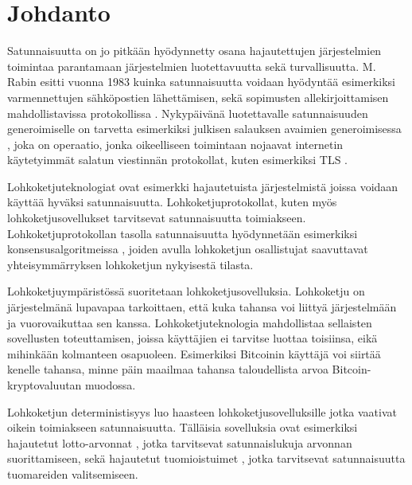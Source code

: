 \chapter{Johdanto\label{intro}}

Satunnaisuutta on jo pitkään hyödynnetty osana hajautettujen järjestelmien toimintaa parantamaan järjestelmien luotettavuutta sekä turvallisuutta. M. Rabin esitti vuonna 1983 kuinka satunnaisuutta voidaan hyödyntää esimerkiksi varmennettujen sähköpostien lähettämisen, sekä sopimusten allekirjoittamisen mahdollistavissa protokollissa \cite{rabin_transaction_1983}. Nykypäivänä luotettavalle satunnaisuuden generoimiselle on tarvetta esimerkiksi julkisen salauksen avaimien generoimisessa \cite{corrigan-gibbs_ensuring_2014}, joka on operaatio, jonka oikeelliseen toimintaan nojaavat internetin käytetyimmät salatun viestinnän protokollat, kuten esimerkiksi TLS \cite{rfc8446}. 

Lohkoketjuteknologiat ovat esimerkki hajautetuista järjestelmistä joissa voidaan käyttää hyväksi satunnaisuutta. Lohkoketjuprotokollat, kuten myös lohkoketjusovellukset tarvitsevat satunnaisuutta toimiakseen. Lohkoketjuprotokollan tasolla satunnaisuutta hyödynnetään esimerkiksi  konsensusalgoritmeissa \cite{gilad_algorand_2017, hanke_dfinity_2018}, joiden avulla lohkoketjun osallistujat saavuttavat yhteisymmärryksen lohkoketjun nykyisestä tilasta. 


Lohkoketjuympäristössä suoritetaan lohkoketjusovelluksia. Lohkoketju on järjestelmänä lupavapaa tarkoittaen, että kuka tahansa voi liittyä järjestelmään ja vuorovaikuttaa sen kanssa. Lohkoketjuteknologia mahdollistaa sellaisten sovellusten toteuttamisen, joissa käyttäjien ei tarvitse luottaa toisiinsa, eikä mihinkään kolmanteen osapuoleen. Esimerkiksi Bitcoinin käyttäjä voi siirtää kenelle tahansa, minne päin maailmaa tahansa taloudellista arvoa Bitcoin-kryptovaluutan muodossa.

Lohkoketjun deterministisyys luo haasteen lohkoketjusovelluksille jotka vaativat oikein toimiakseen satunnaisuutta. Tälläisia sovelluksia ovat esimerkiksi hajautetut lotto-arvonnat \cite{pooltogether_pooltogether_nodate}, jotka tarvitsevat satunnaislukuja arvonnan suorittamiseen, sekä hajautetut tuomioistuimet \cite{lesaege_kleros_2020}, jotka tarvitsevat satunnaisuutta tuomareiden valitsemiseen. 


